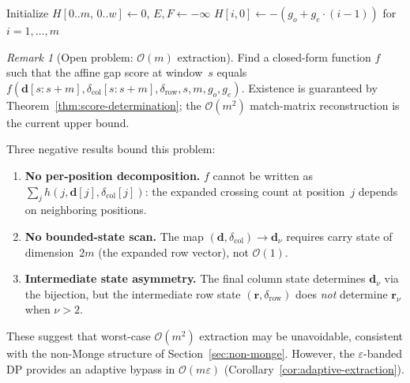 \documentclass[11pt, a4paper]{article}
\theoremstyle{definition}
\theoremstyle{remark}
\newtheorem{remark}[theorem]{Remark}
\newcommand{\dcol}{\mathbf{d}}
\newcommand{\drow}{\mathbf{r}}
\newcommand{\bigO}{\mathcal{O}}
\begin{document}
\begin{algorithm}[htbp]
\caption{$\varepsilon$-Banded Gotoh DP}\label{alg:banded-gotoh}
\BlankLine
Initialize $H[0..m,\, 0..w] \leftarrow 0$,\; $E,F \leftarrow -\infty$\;
$H[i,0] \leftarrow -(g_o + g_e \cdot (i{-}1))$ for $i = 1, \dots, m$\;
\BlankLine
{}
\end{algorithm}

\begin{remark}[Open problem: $\bigO(m)$ extraction]
\label{rem:open-problem}
Find a closed-form function $f$ such that the affine gap score
at window~$s$ equals
$f(\dcol[s{:}s{+}m], \delta_{\mathrm{col}}[s{:}s{+}m],
  \delta_{\mathrm{row}}, s, m, g_o, g_e)$.
Existence is guaranteed by
Theorem~\ref{thm:score-determination}; the $\bigO(m^2)$
match-matrix reconstruction is the current upper bound.

Three negative results bound this problem:
\begin{enumerate}
  \item \textbf{No per-position decomposition.}
    $f$ cannot be written as $\sum_j h(j, \dcol[j],
    \delta_{\mathrm{col}}[j])$: the expanded crossing count at
    position~$j$ depends on neighboring positions.
  \item \textbf{No bounded-state scan.}
    The map $(\dcol, \delta_{\mathrm{col}}) \to \dcol_\nu$
    requires carry state of dimension~$2m$ (the expanded row
    vector), not $\bigO(1)$.
  \item \textbf{Intermediate state asymmetry.}
    The final column state determines $\dcol_\nu$ via the
    bijection, but the intermediate row state
    $(\drow, \delta_{\mathrm{row}})$ does \emph{not} determine
    $\drow_\nu$ when $\nu > 2$.
\end{enumerate}
These suggest that worst-case $\bigO(m^2)$ extraction may be
unavoidable, consistent with the non-Monge structure of
Section~\ref{sec:non-monge}.
However, the $\varepsilon$-banded
DP provides an adaptive bypass in $\bigO(m\varepsilon)$
(Corollary~\ref{cor:adaptive-extraction}).
\end{remark}
\end{document}
